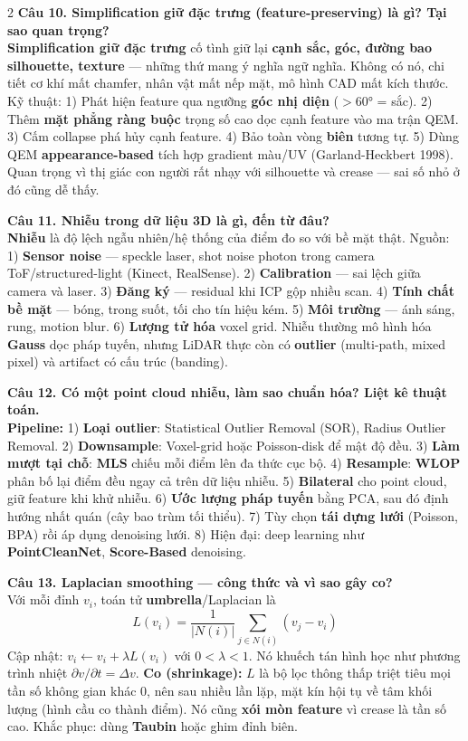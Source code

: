\begin{paracol}{2}
\textbf{Câu 10. Simplification giữ đặc trưng (feature-preserving) là gì? Tại sao quan trọng?}\\
\textbf{Simplification giữ đặc trưng} cố tình giữ lại \textbf{cạnh sắc, góc, đường bao silhouette, texture} — những thứ mang ý nghĩa ngữ nghĩa. Không có nó, chi tiết cơ khí mất chamfer, nhân vật mất nếp mặt, mô hình CAD mất kích thước. Kỹ thuật: 1) Phát hiện feature qua ngưỡng \textbf{góc nhị diện} ($>60°$ = sắc). 2) Thêm \textbf{mặt phẳng ràng buộc} trọng số cao dọc cạnh feature vào ma trận QEM. 3) Cấm collapse phá hủy cạnh feature. 4) Bảo toàn vòng \textbf{biên} tương tự. 5) Dùng QEM \textbf{appearance-based} tích hợp gradient màu/UV (Garland-Heckbert 1998). Quan trọng vì thị giác con người rất nhạy với silhouette và crease — sai số nhỏ ở đó cũng dễ thấy.

\textbf{Câu 11. Nhiễu trong dữ liệu 3D là gì, đến từ đâu?}\\
\textbf{Nhiễu} là độ lệch ngẫu nhiên/hệ thống của điểm đo so với bề mặt thật. Nguồn: 1) \textbf{Sensor noise} — speckle laser, shot noise photon trong camera ToF/structured-light (Kinect, RealSense). 2) \textbf{Calibration} — sai lệch giữa camera và laser. 3) \textbf{Đăng ký} — residual khi ICP gộp nhiều scan. 4) \textbf{Tính chất bề mặt} — bóng, trong suốt, tối cho tín hiệu kém. 5) \textbf{Môi trường} — ánh sáng, rung, motion blur. 6) \textbf{Lượng tử hóa} voxel grid. Nhiễu thường mô hình hóa \textbf{Gauss} dọc pháp tuyến, nhưng LiDAR thực còn có \textbf{outlier} (multi-path, mixed pixel) và artifact có cấu trúc (banding).

\textbf{Câu 12. Có một point cloud nhiễu, làm sao chuẩn hóa? Liệt kê thuật toán.}\\
\textbf{Pipeline:} 1) \textbf{Loại outlier}: Statistical Outlier Removal (SOR), Radius Outlier Removal. 2) \textbf{Downsample}: Voxel-grid hoặc Poisson-disk để mật độ đều. 3) \textbf{Làm mượt tại chỗ}: \textbf{MLS} chiếu mỗi điểm lên đa thức cục bộ. 4) \textbf{Resample}: \textbf{WLOP} phân bố lại điểm đều ngay cả trên dữ liệu nhiễu. 5) \textbf{Bilateral} cho point cloud, giữ feature khi khử nhiễu. 6) \textbf{Ước lượng pháp tuyến} bằng PCA, sau đó định hướng nhất quán (cây bao trùm tối thiểu). 7) Tùy chọn \textbf{tái dựng lưới} (Poisson, BPA) rồi áp dụng denoising lưới. 8) Hiện đại: deep learning như \textbf{PointCleanNet}, \textbf{Score-Based} denoising.

\textbf{Câu 13. Laplacian smoothing — công thức và vì sao gây co?}\\
Với mỗi đỉnh $v_i$, toán tử \textbf{umbrella}/Laplacian là
\[
L(v_i)=\frac{1}{|N(i)|}\sum_{j\in N(i)}(v_j-v_i)
\]
Cập nhật: $v_i\leftarrow v_i+\lambda L(v_i)$ với $0<\lambda<1$. Nó khuếch tán hình học như phương trình nhiệt $\partial v/\partial t=\Delta v$. \textbf{Co (shrinkage):} $L$ là bộ lọc thông thấp triệt tiêu mọi tần số không gian khác 0, nên sau nhiều lần lặp, mặt kín hội tụ về tâm khối lượng (hình cầu co thành điểm). Nó cũng \textbf{xói mòn feature} vì crease là tần số cao. Khắc phục: dùng \textbf{Taubin} hoặc ghim đỉnh biên.


\end{paracol}
